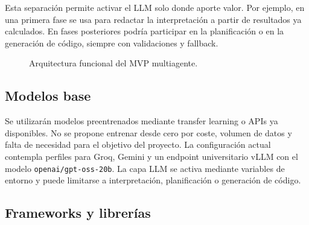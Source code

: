 \documentclass[11pt,a4paper]{article}
\begin{document}
Esta separaci\'on permite activar el LLM solo donde aporte valor. Por ejemplo, en una primera fase se usa para redactar la interpretaci\'on a partir de resultados ya calculados. En fases posteriores podr\'ia participar en la planificaci\'on o en la generaci\'on de c\'odigo, siempre con validaciones y fallback.

\begin{figure}[h]
\centering
\small
{}
\caption{Arquitectura funcional del MVP multiagente.}
\end{figure}

\subsection{Modelos base}

Se utilizar\'an modelos preentrenados mediante transfer learning o APIs ya disponibles. No se propone entrenar desde cero por coste, volumen de datos y falta de necesidad para el objetivo del proyecto. La configuraci\'on actual contempla perfiles para Groq, Gemini y un endpoint universitario vLLM con el modelo \texttt{openai/gpt-oss-20b}. La capa LLM se activa mediante variables de entorno y puede limitarse a interpretaci\'on, planificaci\'on o generaci\'on de c\'odigo.

\subsection{Frameworks y librer\'ias}
\end{document}
